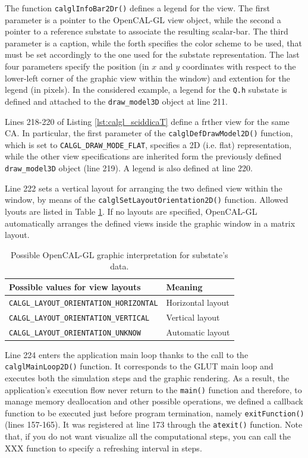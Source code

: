 The function \verb'calglInfoBar2Dr()' defines a legend for the
view. The first parameter is a pointer to the OpenCAL-GL view object,
while the second a pointer to a reference substate to associate the
resulting scalar-bar. The third parameter is a caption, while the
forth specifies the color scheme to be used, that must be set
accordingly to the one used for the substate representation. The last
four parameters specify the position (in $x$ and $y$ coordinates with
respect to the lower-left corner of the graphic view within the
window) and extention for the legend (in pixels). In the considered
example, a legend for the \verb'Q.h' substate is defined and attached
to the \verb'draw_model3D' object at line 211.

Lines 218-220 of Listing \ref{lst:calgl_sciddicaT} define a frther
view for the same CA. In particular, the first parameter of the
\verb'calglDefDrawModel2D()' function, which is set to
\verb'CALGL_DRAW_MODE_FLAT', specifies a 2D (i.e. flat)
representation, while the other view specifications are inherited form
the previously defined \verb'draw_model3D' object (line 219). A legend
is also defined at line 220.

Line 222 sets a vertical layout for arranging the two defined view
within the window, by means of the
\verb'calglSetLayoutOrientation2D()' function. Allowed lyouts are
listed in Table \ref{tab:calgl_layouts}. If no layouts are specified,
OpenCAL-GL automatically arranges the defined views inside the graphic
window in a matrix layout.

\begin{table}
  \centering
  \small
  \begin{tabular}{l|l}
    \hline
    Possible values for view layouts & Meaning\\
    \hline
    \hline
    \verb'CALGL_LAYOUT_ORIENTATION_HORIZONTAL' & Horizontal layout\\
    \verb'CALGL_LAYOUT_ORIENTATION_VERTICAL'   & Vertical layout\\
    \verb'CALGL_LAYOUT_ORIENTATION_UNKNOW'     & Automatic layout\\
    \hline
  \end{tabular}
  \caption{Possible OpenCAL-GL graphic interpretation for substate's data.}
  \label{tab:calgl_layouts}
\end{table} 

Line 224 enters the application main loop thanks to the call to the
\verb'calglMainLoop2D()' function. It corresponds to the GLUT main
loop and executes both the simulation steps and the graphic
rendering. As a result, the application's execution flow never return
to the \verb'main()' function and therefore, to manage memory
deallocation and other possible operations, we defined a callback
function to be executed just before program termination, namely
\verb'exitFunction()' (lines 157-165). It was registered at line 173
through the \verb'atexit()' function. Note that, if you do not want
visualize all the computational steps, you can call the XXX function
to specify a refreshing interval in steps.

